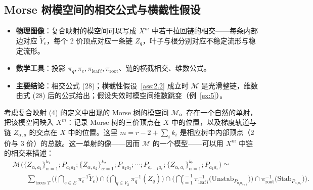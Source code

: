 \subsection{Morse 树模空间的相交公式与横截性假设}\label{sec:2.5}

\begin{takeaway}
\begin{itemize}
  \item \textbf{物理图像}：复合映射的模空间可以写成 $X^m$ 中若干拉回链的相交——每条内部边对应 $\widetilde Y_e$，每个 2 价顶点对应一条链 $Z_q$，叶子与根分别对应不稳定流形与稳定流形。
  \item \textbf{数学工具}：投影 $\pi_q,\pi_e,\pi_{\text{leaf}\,i},\pi_{\text{root}}$、链的横截相交、维数公式。
  \item \textbf{主要结论}：相交公式 (28)；横截性假设~\ref{ass:2.2} 成立时 $\mathcal M$ 是光滑整链，维数由式 (28) 后的公式给出；假设失效时模空间维数跳变（例~\ref{ex:5}）。
\end{itemize}
\end{takeaway}

考虑复合映射 (4) 的定义中出现的 Morse 树的模空间 $\mathcal M$。存在一个自然的单射，把该模空间映入 $X^m$：记录 Morse 树的三价顶点在 $X$ 中的位置，以及梯度轨道与链 $Z_{\alpha,a}$ 的交点在 $X$ 中的位置。这里 $m=r-2+\sum_i k_i$ 是相应树中内部顶点（2 价与 3 价）的总数。这一单射的像——因而 $\mathcal M$ 的一个模型——可以用 $X^m$ 中链的相交来描述：
\begin{equation}\tag{28}\label{eq:28}
\begin{aligned}
  &\mathcal M\bigl(\{Z_{\alpha,a_1}\}_{\alpha=1}^{k_1};P_{a_1a_2};
  \{Z_{\alpha,a_2}\}_{\alpha=1}^{k_2};P_{a_2a_3};\cdots;
  P_{a_{r-1}a_r};\{Z_{\alpha,a_r}\}_{\alpha=1}^{k_r};P_{a_1a_r}\bigr)\simeq{}\\
  &\qquad\sum_{\text{trees }T}
  \Biggl(\biggl(\bigcap_{e\in E}\pi_e^{-1}\widetilde Y_e\biggr)
  \cap\biggl(\bigcap_{q\in V_2}\pi_q^{-1}(Z_q)\biggr)
  \cap\biggl(\bigcap_{i=1}^{r-1}\pi_{\mathrm{leaf}\,i}^{-1}
  \bigl(\mathrm{Unstab}_{P_{a_ia_{i+1}}}\bigr)\biggr)
  \cap\pi_{\mathrm{root}}^{-1}\bigl(\mathrm{Stab}_{P_{a_1a_r}}\bigr)\Biggr).
\end{aligned}
\end{equation}


